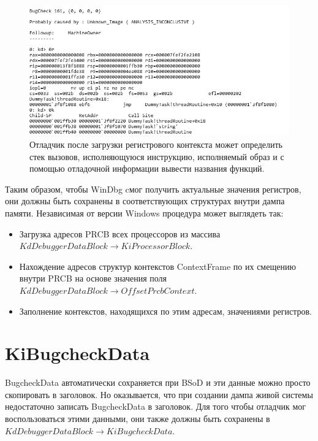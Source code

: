 \documentclass{mipt-thesis-bs}
\begin{document}
\begin{figure}[h]
\begin{center}
    \captionsetup{justification=centering}
    \includegraphics[width=1\textwidth]{ctx2.png}
    \caption{Отладчик после загрузки регистрового контекста может определить стек вызовов, исполняющуюся инструкцию, исполняемый образ и с помощью отладочной информации вывести названия функций.}
    \label{fig:ctx2}
\end{center}
\end{figure}

\newpage
Таким образом, чтобы WinDbg cмог получить актуальные значения регистров, они должны быть сохранены в соответствующих структурах внутри дампа памяти. Независимая от версии Windows процедура может выглядеть так:

\begin{itemize}
\item Загрузка адресов PRCB всех процессоров из массива $KdDebuggerDataBlock \! \rightarrow \! KiProcessorBlock$.
\item Нахождение адресов структур контекстов ContextFrame по их смещению внутри PRCB на основе значения поля $KdDebuggerDataBlock \! \rightarrow \! OffsetPrcbContext$.
\item Заполнение контекстов, находящихся по этим адресам, значениями регистров.
\end{itemize}

\section*{KiBugcheckData}

BugcheckData автоматически сохраняется при BSoD и эти данные можно просто скопировать в заголовок. Но оказывается, что при создании дампа живой системы недостаточно записать BugcheckData в заголовок. Для того чтобы отладчик мог воспользоваться этими данными, они также должны быть сохранены в $KdDebuggerDataBlock \! \rightarrow \! KiBugcheckData$.
\end{document}
